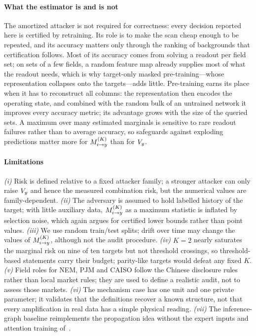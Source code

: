 \paragraph{What the estimator is and is not}
The amortized attacker is not required for correctness: every decision reported here is certified
by retraining. Its role is to make the scan cheap enough to be repeated, and its accuracy matters
only through the ranking of backgrounds that certification follows. Most of its accuracy comes from solving a readout
per field set; on sets of a few fields, a random feature map already supplies most of what the readout needs, which is
why target-only masked pre-training---whose representation collapses onto the targets---adds little. Pre-training
earns its place when it has to reconstruct all columns: the representation then encodes the operating state, and combined
with the random bulk of an untrained network it improves every accuracy metric; its advantage grows with the size of the
queried sets. A maximum over many
estimated marginals is sensitive to rare readout failures rather than to average accuracy, so safeguards against
exploding predictions matter more for $M^{(K)}_{i \to y}$ than for $V_{y}$.

\paragraph{Limitations}
\emph{(i)} Risk is defined relative to a fixed attacker family; a stronger attacker can only raise
$V_{y}$ and hence the measured combination risk, but the numerical values are family-dependent.
\emph{(ii)} The adversary is assumed to hold labelled history of the target; with little auxiliary
data, $M^{(K)}_{i \to y}$ as a maximum statistic is inflated by selection noise, which again argues for certified
lower bounds rather than point values. \emph{(iii)} We use random train/test splits; drift over time
may change the values of $M^{(K)}_{i \to y}$, although not the audit procedure. \emph{(iv)} $K=2$ nearly saturates the marginal risk on nine of ten targets but not threshold
crossings, so threshold-based statements carry their budget; parity-like targets would defeat any fixed $K$. \emph{(v)} Field roles for NEM, PJM and CAISO follow the Chinese disclosure rules rather
than local market rules; they are used to define a realistic audit, not to assess those markets.
\emph{(vi)} The mechanism case has one unit and one private parameter; it validates that the
definitions recover a known structure, not that every amplification in real data has a simple physical
reading. \emph{(vii)} The inference-graph baseline reimplements the propagation idea without the expert inputs
and attention training of~\cite{hu2026ignn}.

